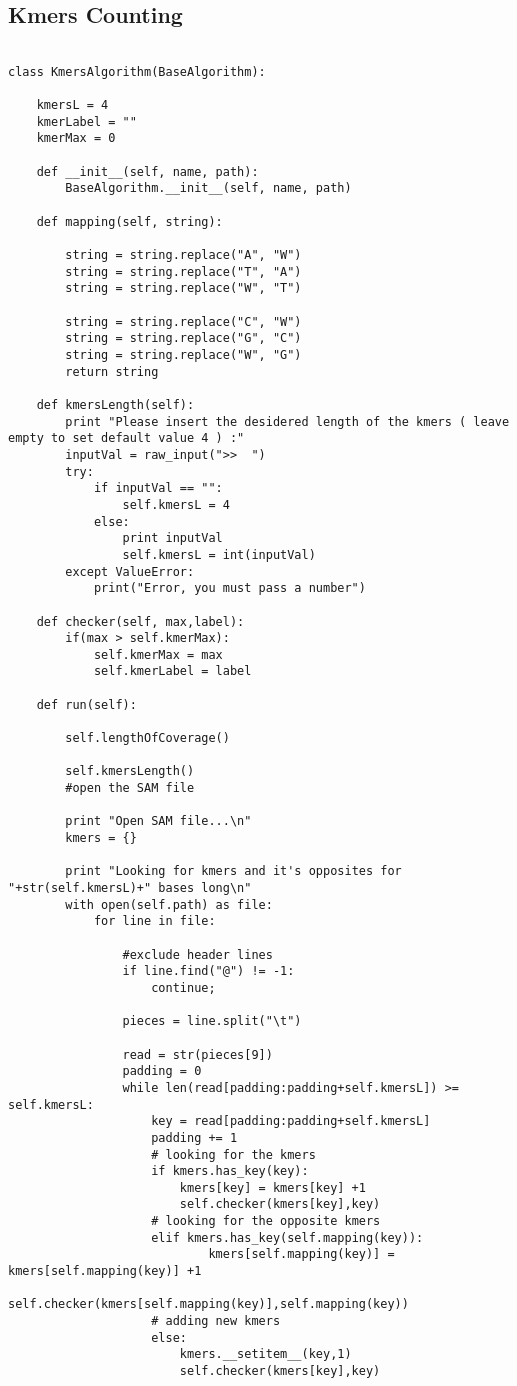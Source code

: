 \subsection{Kmers Counting}
\tiny
\begin{verbatim}

class KmersAlgorithm(BaseAlgorithm):

    kmersL = 4
    kmerLabel = ""
    kmerMax = 0

    def __init__(self, name, path):
        BaseAlgorithm.__init__(self, name, path)

    def mapping(self, string):

        string = string.replace("A", "W")
        string = string.replace("T", "A")
        string = string.replace("W", "T")

        string = string.replace("C", "W")
        string = string.replace("G", "C")
        string = string.replace("W", "G")
        return string

    def kmersLength(self):
        print "Please insert the desidered length of the kmers ( leave empty to set default value 4 ) :"
        inputVal = raw_input(">>  ")
        try:
            if inputVal == "":
                self.kmersL = 4
            else:
                print inputVal
                self.kmersL = int(inputVal)
        except ValueError:
            print("Error, you must pass a number")

    def checker(self, max,label):
        if(max > self.kmerMax):
            self.kmerMax = max
            self.kmerLabel = label

    def run(self):

        self.lengthOfCoverage()

        self.kmersLength()
        #open the SAM file

        print "Open SAM file...\n"
        kmers = {}

        print "Looking for kmers and it's opposites for "+str(self.kmersL)+" bases long\n"
        with open(self.path) as file:
            for line in file:

                #exclude header lines
                if line.find("@") != -1:
                    continue;

                pieces = line.split("\t")

                read = str(pieces[9])
                padding = 0
                while len(read[padding:padding+self.kmersL]) >= self.kmersL:
                    key = read[padding:padding+self.kmersL]
                    padding += 1
                    # looking for the kmers
                    if kmers.has_key(key):
                        kmers[key] = kmers[key] +1
                        self.checker(kmers[key],key)
                    # looking for the opposite kmers
                    elif kmers.has_key(self.mapping(key)):
                            kmers[self.mapping(key)] = kmers[self.mapping(key)] +1
                            self.checker(kmers[self.mapping(key)],self.mapping(key))
                    # adding new kmers
                    else:
                        kmers.__setitem__(key,1)
                        self.checker(kmers[key],key)


\end{verbatim}
